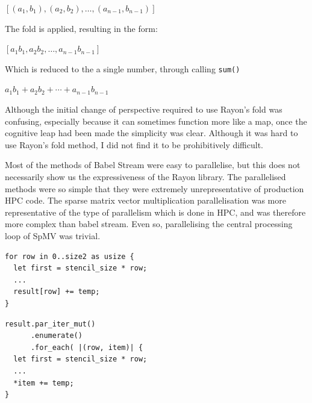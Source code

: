 \begin{center}
$[(a_1, b_1), (a_2, b_2), \ldots, (a_{n-1}, b_{n-1})]$
\end{center}

The fold is applied, resulting in the form:

\begin{center}
$[a_1b_1, a_2b_2, \ldots, a_{n-1}b_{n-1}]$
\end{center}
Which is reduced to the a single number, through calling \texttt{sum()}

\begin{center}
$a_1b_1+a_2b_2+\cdots+a_{n-1}b_{n-1}$
\end{center}

Although the initial change of perspective required to use Rayon's fold was confusing, especially because it can sometimes function more like a map, once the cognitive leap had been made the simplicity was clear. Although it was hard to use Rayon's fold method, I did not find it to be prohibitively difficult.

Most of the methods of Babel Stream were easy to parallelise, but this does not necessarily show us the expressiveness of the Rayon library. The parallelised methods were so simple that they were extremely unrepresentative of production HPC code. The sparse matrix vector multiplication parallelisation was more representative of the type of parallelism which is done in HPC, and was therefore more complex than babel stream. Even so, parallelising the central processing loop of SpMV was trivial.
\noindent\begin{minipage}{.49\textwidth}
\begin{code}
\begin{verbatim}
for row in 0..size2 as usize {
  let first = stencil_size * row;
  ...
  result[row] += temp;
}
\end{verbatim}
\end{code}
\end{minipage}\hfill
\begin{minipage}{.49\textwidth}
\begin{code}
\begin{verbatim}
result.par_iter_mut()
      .enumerate()
      .for_each( |(row, item)| {
  let first = stencil_size * row;
  ...
  *item += temp;
}
\end{verbatim}
\label{lst:spmv-par}
\end{code}
\end{minipage}

